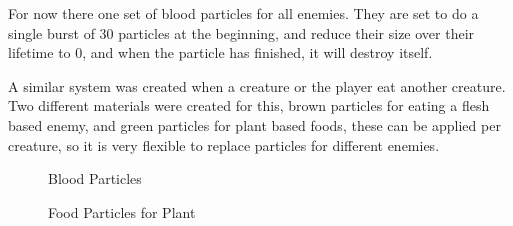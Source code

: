 \documentclass[11pt]{report}
\begin{document}
For now there one set of blood particles for all enemies. They are set to do a single burst of 30 particles at the beginning, and reduce their size over their lifetime to 0, and when the particle has finished, it will destroy itself. 

A similar system was created when a creature or the player eat another creature. Two different materials were created for this, brown particles for eating a flesh based enemy, and green particles for plant based foods, these can be applied per creature, so it is very flexible to replace particles for different enemies.

\begin{figure}[H]
    \begin{minipage}{.5\textwidth}
        \centering
        \caption{Blood Particles}
    \end{minipage}
    \begin{minipage}{.5\textwidth}
        \centering
        \caption{Food Particles for Plant}
    \end{minipage}
\end{figure}
\end{document}
